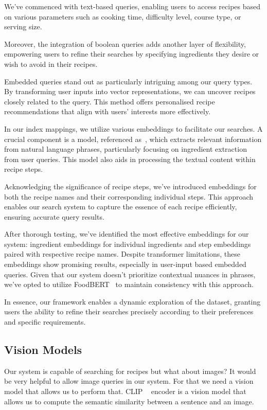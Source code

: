 \documentclass[runningheads]{llncs}
\begin{document}
We've commenced with text-based queries, enabling users to access recipes based on various parameters such as cooking time, difficulty level, course type, or serving size.

Moreover, the integration of boolean queries adds another layer of flexibility, empowering users to refine their searches by specifying ingredients they desire or wish to avoid in their recipes.

Embedded queries stand out as particularly intriguing among our query types. By transforming user inputs into vector representations, we can uncover recipes closely related to the query. This method offers personalised recipe recommendations that align with users' interests more effectively.

In our index mappings, we utilize various embeddings to facilitate our searches. A crucial component is a model, referenced as~\cite{bert}, which extracts relevant information from natural language phrases, particularly focusing on ingredient extraction from user queries. This model also aids in processing the textual content within recipe steps.

Acknowledging the significance of recipe steps, we've introduced embeddings for both the recipe names and their corresponding individual steps. This approach enables our search system to capture the essence of each recipe efficiently, ensuring accurate query results.

After thorough testing, we've identified the most effective embeddings for our system: ingredient embeddings for individual ingredients and step embeddings paired with respective recipe names. Despite transformer limitations, these embeddings show promising results, especially in user-input based embedded queries. Given that our system doesn't prioritize contextual nuances in phrases, we've opted to utilize FoodBERT~\cite{bert} to maintain consistency with this approach.

In essence, our framework enables a dynamic exploration of the dataset, granting users the ability to refine their searches precisely according to their preferences and specific requirements.

\subsection{Vision Models}
Our system is capable of searching for recipes but what about images? It would be very helpful to allow image queries in our system. For that we need a vision model that allows us to perform that. CLIP ~\cite{clip} encoder is a vision model that allows us to compute the semantic similarity between a sentence and an image.
\end{document}
